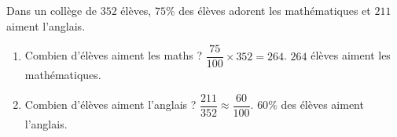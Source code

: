 \begin{pageCours}
\begin{ExCor}

Dans un collège de  $352$ élèves, $75\%$ des élèves adorent les mathématiques et $211$ aiment l'anglais.
 
 \begin{enumerate}[leftmargin=*]
 \item Combien d'élèves aiment les maths ? $\dfrac{75}{100} \times 352 = 264$. $264$ élèves aiment les mathématiques.
 \item Combien d'élèves aiment l'anglais ? $\dfrac{211}{352} \approx \dfrac{60}{100} $. $60\%$ des élèves aiment l'anglais.
 \end{enumerate}
 
\end{ExCor}
 



\end{pageCours}


